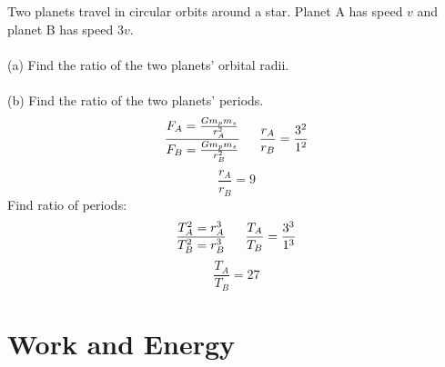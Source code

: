 \documentclass{article}
\begin{document}
        \begin{multicols}{2}
        	
			Two planets travel in circular orbits around a star.  Planet A has speed $v$ and planet B has speed $3v$.\\\\ (a) Find the ratio of the two planets’ orbital radii.\\\\ (b) Find the ratio of the two planets’ periods.
			\vfill
			\columnbreak
			\[
				\frac
                {F_A=\frac{Gm_pm_s}{r_A^2}}
                {F_B=\frac{Gm_pm_s}{r_B^2}}
                \indent
                \frac{r_A}{r_B}=\frac
                {3^2}
                {1^2}
			\]
			\[
             	\frac{r_A}{r_B}=9
			\]
			Find ratio of periods:
			\[
             	\frac
                {T_A^2=r_A^3}
                {T_B^2=r_B^3}
                \indent
                \frac
                {T_A}
				{T_B} = \frac{3^3}{1^3}
			\]
			\[
             	\frac{T_A}{T_B}=27
			\]
		\end{multicols}
        
\section{Work and Energy}
        
\end{document}
